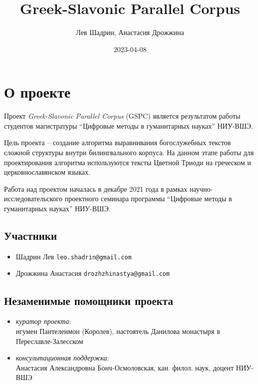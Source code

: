 \documentclass[
  letterpaper,
]{book}
\title{Greek-Slavonic Parallel Corpus}
\author{Лев Шадрин, Анастасия Дрожжина}
\date{2023-04-08}
\renewcommand*\contentsname{Содержание}
\newcommand\contentsname{Содержание}
\begin{document}
\frontmatter
\maketitle
\ifdefined\Shaded\renewenvironment{Shaded}{\begin{tcolorbox}[enhanced, sharp corners, interior hidden, frame hidden, breakable, borderline west={3pt}{0pt}{shadecolor}, boxrule=0pt]}{\end{tcolorbox}}\fi

\renewcommand*\contentsname{Содержание}
{
\setcounter{tocdepth}{2}
\tableofcontents
}
\mainmatter
{}

\hypertarget{sec-about_project}{%
\chapter{О проекте}\label{sec-about_project}}

Проект \emph{Greek-Slavonic Parallel Corpus} (GSPC) является результатом
работы студентов магистратуры ``Цифровые методы в гуманитарных науках''
НИУ-ВШЭ.

Цель проекта -- создание алгоритма выравнивания богослужебных текстов
сложной структуры внутри билингвального корпуса. На данном этапе работы
для проектирования алгоритма используются тексты Цветной Триоди на
греческом и церковнославянском языках.

Работа над проектом началась в декабре 2021 года в рамках
научно-исследовательского проектного семинара программы ``Цифровые
методы в гуманитарных науках'' НИУ-ВШЭ.

\hypertarget{sec-authors}{%
\section{Участники}\label{sec-authors}}

\begin{itemize}
\item
  Шадрин Лев \texttt{leo.shadrin@gmail.com}
\item
  Дрожжина Анастасия \texttt{drozhzhinastya@gmail.com}
\end{itemize}

\hypertarget{sec-acknowledgements}{%
\section{Незаменимые помощники проекта}\label{sec-acknowledgements}}

\begin{itemize}
\item
  \emph{куратор проекта}:\\
  игумен Пантелеимон (Королев), настоятель Данилова монастыря в
  Переславле-Залесском
\item
  \emph{консультационная поддержка}:\\
  Анастасия Александровна Бонч-Осмоловская, кан. филол. наук, доцент
  НИУ-ВШЭ
\end{itemize}
\end{document}
